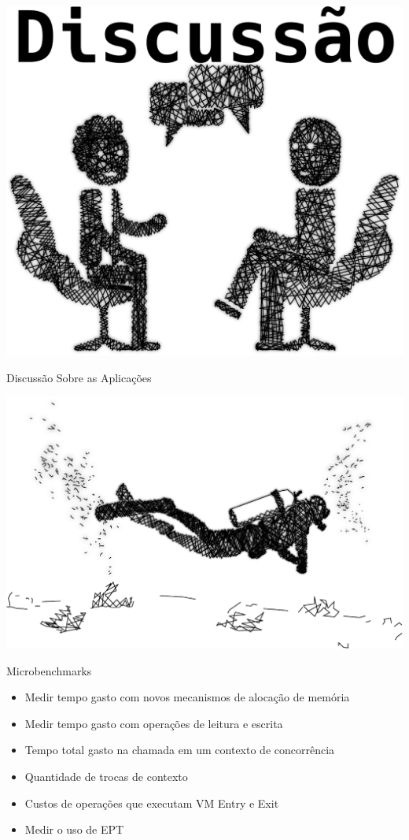 \documentclass[xcolor={usenames,svgnames,dvipsnames},brazil,english,12pt,aspectratio=149]{beamer}
\begin{document}
\begin{frame}[plain]
  \centering
  \includegraphics[width=.7\textwidth]{discuss}
\end{frame}

\begin{frame}{Discussão Sobre as Aplicações}
  
\end{frame}

\begin{frame}[plain]
  \includegraphics[width=\textwidth]{presentation_cap3_sec4}
\end{frame}

\begin{frame}{Microbenchmarks}

  \begin{itemize}
    \item Medir tempo gasto com novos mecanismos de alocação de memória
    \item Medir tempo gasto com operações de leitura e escrita
    \item Tempo total gasto na chamada em um contexto de concorrência
    \item Quantidade de trocas de contexto
    \item Custos de operações que executam VM Entry e Exit
    \item Medir o uso de EPT
  \end{itemize}

\end{frame}
\end{document}

